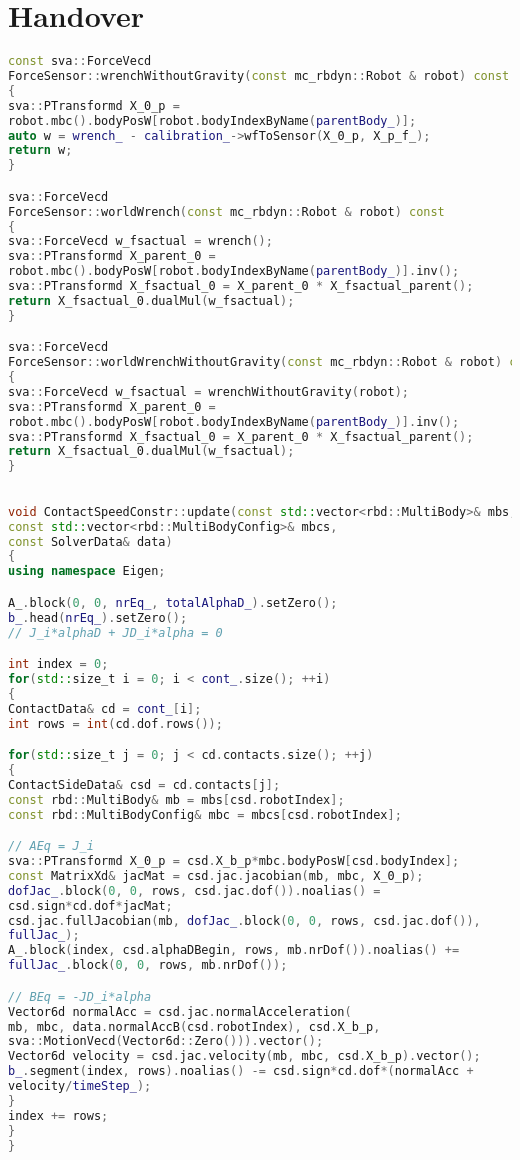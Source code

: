 \chapter{Handover}

\begin{lstlisting}[language=C++,basicstyle=\footnotesize, caption={wrench}]
const sva::ForceVecd 
ForceSensor::wrenchWithoutGravity(const mc_rbdyn::Robot & robot) const
{
sva::PTransformd X_0_p = 
robot.mbc().bodyPosW[robot.bodyIndexByName(parentBody_)];
auto w = wrench_ - calibration_->wfToSensor(X_0_p, X_p_f_);
return w;
}

sva::ForceVecd 
ForceSensor::worldWrench(const mc_rbdyn::Robot & robot) const
{
sva::ForceVecd w_fsactual = wrench();
sva::PTransformd X_parent_0 = 
robot.mbc().bodyPosW[robot.bodyIndexByName(parentBody_)].inv();
sva::PTransformd X_fsactual_0 = X_parent_0 * X_fsactual_parent();
return X_fsactual_0.dualMul(w_fsactual);
}

sva::ForceVecd 
ForceSensor::worldWrenchWithoutGravity(const mc_rbdyn::Robot & robot) const
{
sva::ForceVecd w_fsactual = wrenchWithoutGravity(robot);
sva::PTransformd X_parent_0 = 
robot.mbc().bodyPosW[robot.bodyIndexByName(parentBody_)].inv();
sva::PTransformd X_fsactual_0 = X_parent_0 * X_fsactual_parent();
return X_fsactual_0.dualMul(w_fsactual);
}
\end{lstlisting}




\begin{lstlisting}[language=C++,basicstyle=\footnotesize, caption={QPContactConstr}]

void ContactSpeedConstr::update(const std::vector<rbd::MultiBody>& mbs,
const std::vector<rbd::MultiBodyConfig>& mbcs,
const SolverData& data)
{
using namespace Eigen;

A_.block(0, 0, nrEq_, totalAlphaD_).setZero();
b_.head(nrEq_).setZero();
// J_i*alphaD + JD_i*alpha = 0

int index = 0;
for(std::size_t i = 0; i < cont_.size(); ++i)
{
ContactData& cd = cont_[i];
int rows = int(cd.dof.rows());

for(std::size_t j = 0; j < cd.contacts.size(); ++j)
{
ContactSideData& csd = cd.contacts[j];
const rbd::MultiBody& mb = mbs[csd.robotIndex];
const rbd::MultiBodyConfig& mbc = mbcs[csd.robotIndex];

// AEq = J_i
sva::PTransformd X_0_p = csd.X_b_p*mbc.bodyPosW[csd.bodyIndex];
const MatrixXd& jacMat = csd.jac.jacobian(mb, mbc, X_0_p);
dofJac_.block(0, 0, rows, csd.jac.dof()).noalias() =
csd.sign*cd.dof*jacMat;
csd.jac.fullJacobian(mb, dofJac_.block(0, 0, rows, csd.jac.dof()),
fullJac_);
A_.block(index, csd.alphaDBegin, rows, mb.nrDof()).noalias() +=
fullJac_.block(0, 0, rows, mb.nrDof());

// BEq = -JD_i*alpha
Vector6d normalAcc = csd.jac.normalAcceleration(
mb, mbc, data.normalAccB(csd.robotIndex), csd.X_b_p,
sva::MotionVecd(Vector6d::Zero())).vector();
Vector6d velocity = csd.jac.velocity(mb, mbc, csd.X_b_p).vector();
b_.segment(index, rows).noalias() -= csd.sign*cd.dof*(normalAcc +
velocity/timeStep_);
}
index += rows;
}
}
\end{lstlisting}
